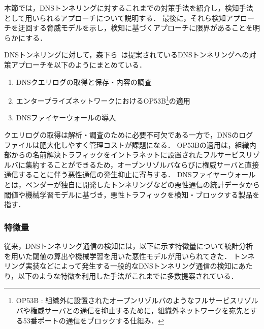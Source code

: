 本節では，DNSトンネリングに対するこれまでの対策手法を紹介し，検知手法として用いられるアプローチについて説明する．
最後に，それら検知アプローチを迂回する脅威モデルを示し，検知に基づくアプローチに限界があることを明らかにする．

DNSトンネリングに対して，森下ら~\cite{morishita}は提案されているDNSトンネリングへの対策アプローチを以下のようにまとめている．
\begin{enumerate}
 \item DNSクエリログの取得と保存・内容の調査
 \vspace{-0.5cm}
 \item エンタープライズネットワークにおけるOP53B\footnote{OP53B : 組織外に設置されたオープンリゾルバのようなフルサービスリゾルバや権威サーバとの通信を抑止するために，組織外ネットワークを宛先とする53番ポートの通信をブロックする仕組み．}の適用
 \vspace{-0.5cm}
 \item DNSファイヤーウォールの導入
\end{enumerate}
クエリログの取得は解析・調査のために必要不可欠である一方で，DNSのログファイルは肥大化しやすく管理コストが課題になる．
OP53Bの適用は，組織内部からの名前解決トラフィックをイントラネットに設置されたフルサービスリゾルバに集約することができるため，オープンリゾルバならびに権威サーバと直接通信することに伴う悪性通信の発生抑止に寄与する．
DNSファイヤーウォールとは，ベンダーが独自に開発したトンネリングなどの悪性通信の統計データから閾値や機械学習モデルに基づき，悪性トラフィックを検知・ブロックする製品を指す．

\subsubsection{特徴量}
\label{sec:pre-tunnel-feature}
従来，DNSトンネリング通信の検知には，以下に示す特徴量について統計分析を用いた閾値の算出や機械学習を用いた悪性モデルが用いられてきた．
トンネリング実装などによって発生する一般的なDNSトンネリング通信の検知にあたり，以下のような特徴を利用した手法がこれまでに多数提案されている．\newline


